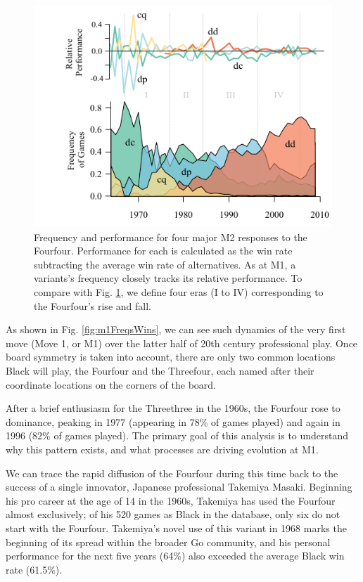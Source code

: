 \documentclass[reqno,12pt]{amsart}
\begin{document}
\begin{figure}[t]
  \begin{center}
    \includegraphics[scale=1.2]{./assets/m2FreqsWins.pdf}
    \caption{Frequency and performance for four major M2 responses to the Fourfour. Performance for each is calculated as the win rate subtracting the average win rate of alternatives. As at M1, a variants's frequency closely tracks its relative performance. To compare with Fig. \ref{fig:m2FreqsWins}, we define four eras (I to IV) corresponding to the Fourfour's rise and fall.}
    \label{fig:m2FreqsWins}
  \end{center}
\end{figure}

\clearpage

As shown in Fig. \ref{fig:m1FreqsWins}, we can see such dynamics of the very first move (Move 1, or M1) over the latter half of 20th century professional play. Once board symmetry is taken into account, there are only two common locations Black will play, the Fourfour and the Threefour, each named after their coordinate locations on the corners of the board.

After a brief enthusiasm for the Threethree in the 1960s, the Fourfour rose to dominance, peaking in 1977 (appearing in 78\% of games played) and again in 1996 (82\% of games played). The primary goal of this analysis is to understand why this pattern exists, and what processes are driving evolution at M1.

We can trace the rapid diffusion of the Fourfour during this time back to the success of a single innovator, Japanese professional Takemiya Masaki. Beginning his pro career at the age of 14 in the 1960s, Takemiya has used the Fourfour almost exclusively; of his 520 games as Black in the database, only six do not start with the Fourfour. Takemiya's novel use of this variant in 1968 marks the beginning of its spread within the broader Go community, and his personal performance for the next five years (64\%) also exceeded the average Black win rate (61.5\%).
\end{document}
